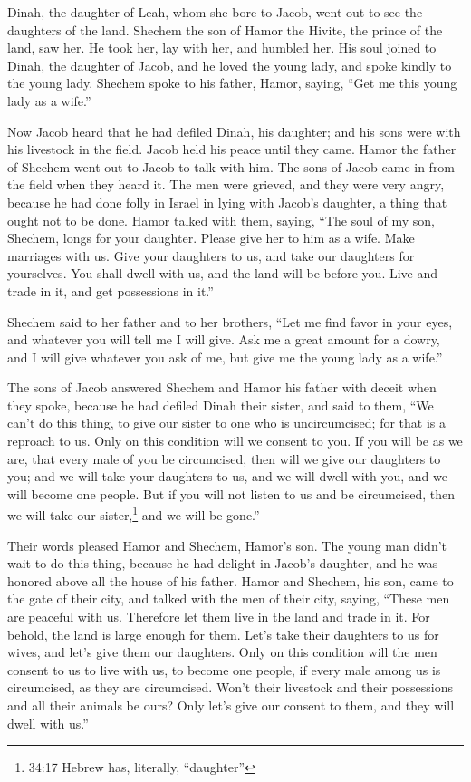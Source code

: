 \mychapter{}
\myverse*{}Dinah, the daughter of Leah, whom she bore to Jacob, went out to see the daughters of the land. \myverse{}Shechem the son of Hamor the Hivite, the prince of the land, saw her. He took her, lay with her, and humbled her. \myverse{}His soul joined to Dinah, the daughter of Jacob, and he loved the young lady, and spoke kindly to the young lady. \myverse{}Shechem spoke to his father, Hamor, saying, “Get me this young lady as a wife.”

\myverse{}Now Jacob heard that he had defiled Dinah, his daughter; and his sons were with his livestock in the field. Jacob held his peace until they came. \myverse{}Hamor the father of Shechem went out to Jacob to talk with him. \myverse{}The sons of Jacob came in from the field when they heard it. The men were grieved, and they were very angry, because he had done folly in Israel in lying with Jacob’s daughter, a thing that ought not to be done. \myverse{}Hamor talked with them, saying, “The soul of my son, Shechem, longs for your daughter. Please give her to him as a wife. \myverse{}Make marriages with us. Give your daughters to us, and take our daughters for yourselves. \myverse{}You shall dwell with us, and the land will be before you. Live and trade in it, and get possessions in it.”

\myverse{}Shechem said to her father and to her brothers, “Let me find favor in your eyes, and whatever you will tell me I will give. \myverse{}Ask me a great amount for a dowry, and I will give whatever you ask of me, but give me the young lady as a wife.”

\myverse{}The sons of Jacob answered Shechem and Hamor his father with deceit when they spoke, because he had defiled Dinah their sister, \myverse{}and said to them, “We can’t do this thing, to give our sister to one who is uncircumcised; for that is a reproach to us. \myverse{}Only on this condition will we consent to you. If you will be as we are, that every male of you be circumcised, \myverse{}then will we give our daughters to you; and we will take your daughters to us, and we will dwell with you, and we will become one people. \myverse{}But if you will not listen to us and be circumcised, then we will take our sister,\footnote{34:17 Hebrew has, literally, “daughter”} and we will be gone.”

\myverse{}Their words pleased Hamor and Shechem, Hamor’s son. \myverse{}The young man didn’t wait to do this thing, because he had delight in Jacob’s daughter, and he was honored above all the house of his father. \myverse{}Hamor and Shechem, his son, came to the gate of their city, and talked with the men of their city, saying, \myverse{}“These men are peaceful with us. Therefore let them live in the land and trade in it. For behold, the land is large enough for them. Let’s take their daughters to us for wives, and let’s give them our daughters. \myverse{}Only on this condition will the men consent to us to live with us, to become one people, if every male among us is circumcised, as they are circumcised. \myverse{}Won’t their livestock and their possessions and all their animals be ours? Only let’s give our consent to them, and they will dwell with us.”

